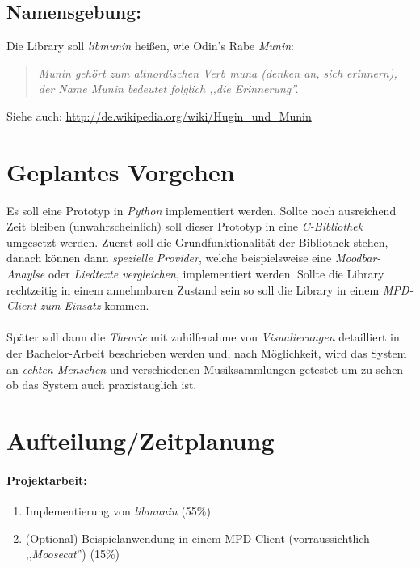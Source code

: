 \documentclass[8pt,a4paper,ngerman]{scrartcl}
\begin{document}
    \subsection{Namensgebung:}

        Die Library soll \emph{libmunin} heißen, wie Odin's Rabe \emph{Munin}:

        \begin{quote}
            \textit{Munin gehört zum altnordischen Verb muna (denken an, sich erinnern), 
            der Name Munin bedeutet folglich ,,die Erinnerung''.}
        \end{quote}

        Siehe auch: \url{http://de.wikipedia.org/wiki/Hugin_und_Munin}

\section{Geplantes Vorgehen}
    Es soll eine Prototyp in \emph{Python} implementiert werden. Sollte noch
    ausreichend Zeit bleiben (unwahrscheinlich) soll dieser Prototyp in eine
    \emph{C-Bibliothek} umgesetzt werden. Zuerst soll die Grundfunktionalität der
    Bibliothek stehen, danach können dann \emph{spezielle Provider}, welche
    beispielsweise eine \emph{Moodbar-Anaylse} oder \emph{Liedtexte vergleichen}, implementiert
    werden. Sollte die Library rechtzeitig in einem annehmbaren Zustand sein so soll
    die Library in einem \emph{MPD-Client zum Einsatz} kommen. 
    \\
    \\
    Später soll dann die \emph{Theorie} mit zuhilfenahme von \emph{Visualierungen} detailliert in 
    der Bachelor-Arbeit beschrieben werden und, nach Möglichkeit, wird das System an 
    \emph{echten Menschen} und verschiedenen Musiksammlungen getestet um zu sehen ob das
    System auch praxistauglich ist.


\section{Aufteilung/Zeitplanung}
    \paragraph{Projektarbeit:}
        \begin{enumerate} 
            \item Implementierung von \emph{libmunin} (55\%)
            \item (Optional) Beispielanwendung in einem MPD-Client (vorraussichtlich
                ,,\emph{Moosecat}'') (15\%)
        \end{enumerate}
\end{document}
